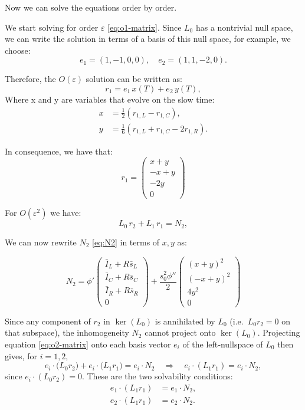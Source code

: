 \documentclass[12,twoside]{TFG-GM}
\theoremstyle{definition}
\theoremstyle{remark}
\begin{document}
\bigskip

Now we can solve the equations order by order.

We start solving for order $\varepsilon$ \eqref{eq:o1-matrix}. Since \(L_0\) has a nontrivial null space, we can write the solution in terms of a basis of this null space, for example, we choose:
\[
e_1 = (1, -1, 0, 0), \quad e_2 = (1, 1, -2, 0).
\]

Therefore, the $O(\varepsilon)$ solution can be written as:
\[
r_1 = e_1\,x(T) + e_2\,y(T),
\]
Where x and y are variables that evolve on the slow time:
\begin{equation}
\begin{aligned}
x &= \frac 12(r_{1,L}-r_{1,C}),\\
y &=  \frac 16 (r_{1,L}+r_{1,C}-2r_{1,R}).
\end{aligned}
\label{eq:x-y-definition}
\end{equation}


In consequence, we have that:
\begin{equation}
r_{1} = \begin{pmatrix}x+y\\-x+y\\-2y\\0 \end{pmatrix} 
\label{eq:r1-definition}
\end{equation}


For $O(\varepsilon^2)$ we have:
\begin{equation}
  L_0\,r_2 + L_1\,r_1 = N_2,
  \label{eq:o2-matrix}
\end{equation}

We can now rewrite $N_2$ \eqref{eq:N2} in terms of $x, y$ as:

\begin{equation}
N_2 = \phi'\begin{pmatrix}
\bar{I}_L + R\bar{s}_L  \\
\bar{I}_C  + R\bar{s}_C \\ 
\bar{I}_R + R\bar{s}_R \\ 
0
\end{pmatrix} + \frac{s_0^2 \phi''}{2} 
\begin{pmatrix}
(x +y)^2\\  
(-x + y)^2\\  
4y^2\\ 
0
\end{pmatrix}
\label{eq:N2-xy}
\end{equation}


Since any component of \(r_2\) in \(\ker(L_0)\) is annihilated by \(L_0\) (i.e.\ \(L_0r_2=0\) on that subspace), the inhomogeneity \(N_2\) cannot project onto \(\ker(L_0)\).  Projecting equation \eqref{eq:o2-matrix} onto each basis vector \(e_i\) of the left‐nullspace of \(L_0\) then gives, for \(i=1,2\),  
\[
e_i\cdot\bigl(L_0r_2\bigr) + e_i\cdot\bigl(L_1r_1\bigr)
= e_i\cdot\!N_2
\quad\Longrightarrow\quad
e_i\cdot\!(L_1r_1)=e_i\cdot\!N_2,
\]
since \(e_i\cdot(L_0r_2)=0\).  These are the two solvability conditions:
\[
\begin{aligned}
e_1\cdot(L_1r_1)&=e_1\cdot N_2,\\
e_2\cdot(L_1r_1)&=e_2\cdot N_2.
 \label{eq:solvability1}
\end{aligned}
\]
\end{document}
